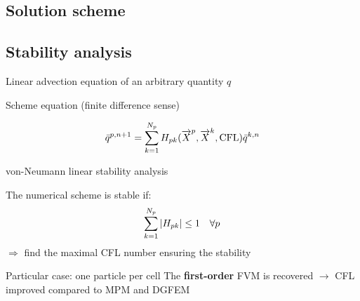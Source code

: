 \subsection{Solution scheme}




\subsection{Stability analysis}
\begin{frame}{Linear advection equation of an arbitrary quantity $q$}%
  \begin{block}{Scheme equation (finite difference sense)}
    \begin{footnotesize}
      \begin{equation*}
        \bar{q}^{p,n+1}=\sum_{k=1}^{N_p}H_{pk}({\overrightarrow{X}}^p,{\overrightarrow{X}}^k,\text{CFL})\bar{q}^{k,n}
      \end{equation*}
    \end{footnotesize}
  \end{block}
  \begin{block}{von-Neumann linear stability analysis}
    \begin{footnotesize}
      The numerical scheme is stable if:
      \begin{equation*}
        \sum_{k=1}^{N_p}\left\vert H_{pk}\right\vert \leq 1 \quad \forall p
      \end{equation*}
      \alert{$\Rightarrow$ find the maximal CFL number ensuring the stability}
    \end{footnotesize}
  \end{block}\pause
  \begin{footnotesize}
    \begin{block}{Particular case: one particle per cell}
      The \textbf{first-order} FVM is recovered $\rightarrow$ CFL improved compared to MPM and DGFEM
    \end{block}
  \end{footnotesize}
\end{frame}


